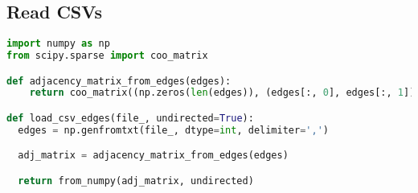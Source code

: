 \documentclass[sigconf]{acmart}
\begin{document}
\subsection{Read CSVs} \label{edge_lists}

\begin{lstlisting}[language=python]
import numpy as np
from scipy.sparse import coo_matrix

def adjacency_matrix_from_edges(edges):
    return coo_matrix((np.zeros(len(edges)), (edges[:, 0], edges[:, 1])))

def load_csv_edges(file_, undirected=True):
  edges = np.genfromtxt(file_, dtype=int, delimiter=',')

  adj_matrix = adjacency_matrix_from_edges(edges)

  return from_numpy(adj_matrix, undirected)
\end{lstlisting}
\end{document}
